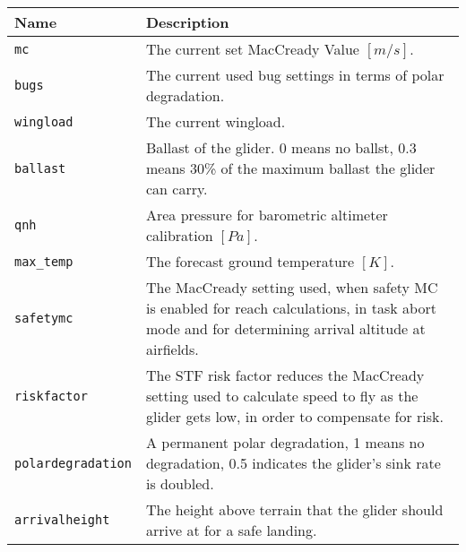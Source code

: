\begin{maxipage}
\begin{tabularx}{1.9\textwidth}{l|X}
Name & Description \\
\hline\hline

\verb|mc| & The current set MacCready Value
$[{m/s}]$.\\

\hline

\verb|bugs| & The current used bug settings in terms of polar degradation.\\

\hline

\verb|wingload| & The current wingload.\\

\hline

\verb|ballast| & Ballast of the glider. 0 means no ballst, 0.3 means 30\% of
the maximum \newline  ballast the glider can carry.\\

\hline

\verb|qnh| & Area pressure for barometric altimeter calibration
$[{Pa}]$.\\

\hline

\verb|max_temp| & The forecast ground temperature
$[{K}]$.\\

\hline

\verb|safetymc| & The MacCready setting used, when safety MC is enabled 
for reach \newline calculations, in task abort mode and for determining arrival altitude 
at \newline airfields.\\

\hline

\verb|riskfactor| & The STF risk factor reduces the MacCready setting used to 
calculate \newline speed to fly as the glider gets low, in order to  compensate for risk.\\

\hline

\verb|polardegradation| & A permanent polar degradation, 1 means no degradation,
0.5 indicates the \newline glider's sink rate is doubled.\\

\hline

\verb|arrivalheight| & The height above terrain that the glider should arrive
at for a safe landing.\\


\end{tabularx}
\end{maxipage}
